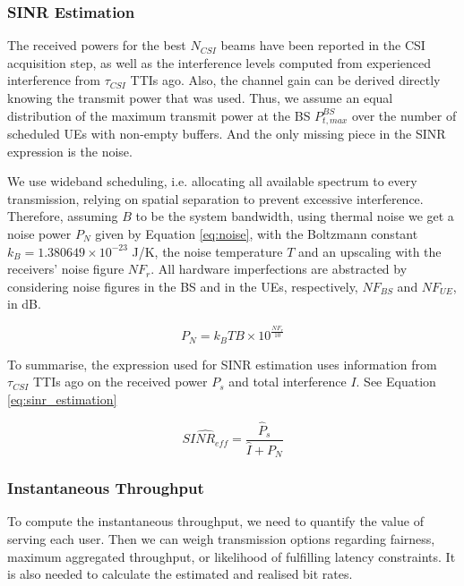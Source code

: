 \subsubsection*{SINR Estimation}

The received powers for the best $N_{CSI}$ beams have been reported in the CSI acquisition step, as well as the interference levels computed from experienced interference from $\tau_{CSI}$ TTIs ago. Also, the channel gain can be derived directly knowing the transmit power that was used. Thus, we assume an equal distribution of the maximum transmit power at the BS $P_{t, max} ^ {BS}$ over the number of scheduled UEs with non-empty buffers. And the only missing piece in the SINR expression is the noise. 

We use wideband scheduling, i.e. allocating all available spectrum to every transmission, relying on spatial separation to prevent excessive interference. Therefore, assuming $B$ to be the system bandwidth, using thermal noise we get a noise power $P_N$ given by Equation \eqref{eq:noise}, with the Boltzmann constant $k_B = 1.380649 \times 10^{-23}$ J/K, the noise temperature $T$ and an upscaling with the receivers' noise figure $NF_r$. All hardware imperfections are abstracted by considering noise figures in the \acs{BS} and in the \acsp{UE}, respectively, $NF_{BS}$ and $NF_{UE}$, in dB.


\begin{equation} \label{eq:noise}
    P_N = k_B T B \times 10^{\frac{NF_r}{10}}
\end{equation}

To summarise, the expression used for SINR estimation uses information from $\tau_{CSI}$ TTIs ago on the received power $P_s$ and total interference $I$. See Equation \ref{eq:sinr_estimation}

\begin{equation} \label{eq:sinr_estimation}
    \hat{SINR_{eff}} = \frac{\hat{P}_s}{\hat{I} + P_N} 
\end{equation}

\subsubsection*{Instantaneous Throughput}

To compute the instantaneous throughput, we need to quantify the value of serving each user. Then we can weigh transmission options regarding fairness, maximum aggregated throughput, or likelihood of fulfilling latency constraints. It is also needed to calculate the estimated and realised bit rates.

